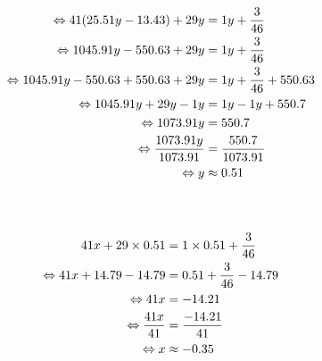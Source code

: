 \documentclass{article}%
\begin{document}
\\%
\ \\%
\vspace{5mm}%
\newline%
\begin{align*}%
\ \Leftrightarrow  41(25.51y - 13.43) + 29y &= 1y + \frac{3}{46} \\%
\vspace{5mm}%
\newline%
\ \Leftrightarrow  1045.91y - 550.63 + 29y &= 1y + \frac{3}{46} \\%
\vspace{5mm}%
\newline%
\ \Leftrightarrow  1045.91y - 550.63 +550.63 + 29y &= 1y + \frac{3}{46} +550.63 \\%
\vspace{5mm}%
\newline%
\ \Leftrightarrow  1045.91y +29y - 1y &= 1y -1y + 550.7 \\%
\vspace{5mm}%
\newline%
\ \Leftrightarrow  1073.91y &= 550.7 \\%
\vspace{5mm}%
\newline%
\ \Leftrightarrow  \frac{1073.91y}{1073.91} &= \frac{550.7}{1073.91} \\%
\vspace{5mm}%
\newline%
\ \Leftrightarrow y &\approx 0.51 \\%
\vspace{5mm}%
\newline%
\end{align*}%
\ \\%
\vspace{5mm}%
\newline%
\begin{align*}%
\  41x + 29 \times 0.51 &= 1 \times 0.51 + \frac{3}{46} \\%
\vspace{5mm}%
\newline%
\ \Leftrightarrow 41x + 14.79 - 14.79 &= 0.51 +\frac{3}{46} -14.79 \\%
\vspace{5mm}%
\newline%
\ \Leftrightarrow 41x &= -14.21 \\%
\vspace{5mm}%
\newline%
\ \Leftrightarrow \frac{41x}{41} &= \frac{-14.21}{41} \\%
\vspace{5mm}%
\newline%
\ \Leftrightarrow x &\approx -0.35 \\%
\vspace{5mm}%
\newline%
\end{align*}%
\end{document}
